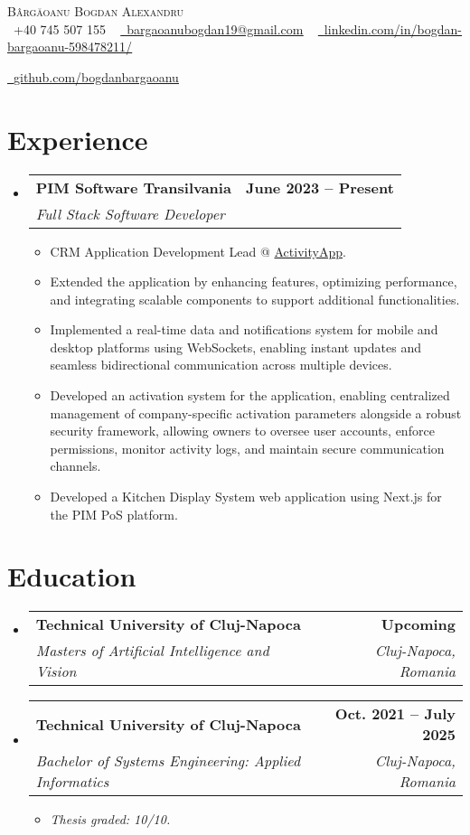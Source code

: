 \documentclass[letterpaper,11pt]{article}
\makeatletter
\newcommand{\resumeItem}[1]{
  \item\small{
    {#1 \vspace{-2pt}}
  }
}
\newcommand{\resumeSubheading}[4]{
  \vspace{-2pt}\item
    \begin{tabular*}{1.0\textwidth}[t]{l@{\extracolsep{\fill}}r}
      \textbf{#1} & \textbf{\small #2} \\
      \textit{\small#3} & \textit{\small #4} \\
    \end{tabular*}\vspace{-7pt}
}
\newcommand{\resumeSubHeadingListStart}{\begin{itemize}[leftmargin=0.0in, label={}]}
\newcommand{\resumeSubHeadingListEnd}{\end{itemize}}
\newcommand{\resumeItemListStart}{\begin{itemize}}
\newcommand{\resumeItemListEnd}{\end{itemize}\vspace{-5pt}}
\makeatother
\begin{document}
\begin{center}
    {\Huge \scshape Bârgăoanu Bogdan Alexandru} \\ \vspace{1pt}
    \small \raisebox{-0.1\height}\faPhone\ +40 745 507 155 ~ 
    \href{mailto:bargaoanubogdan19@gmail.com}{\raisebox{-0.2\height}\faEnvelope\  \underline{bargaoanubogdan19@gmail.com}} ~ 
    \href{https://linkedin.com/in//}{\raisebox{-0.2\height}\faLinkedin\ \underline{linkedin.com/in/bogdan-bargaoanu-598478211/}}  ~
    
    \href{https://github.com/bogdanbargaoanu}{\raisebox{-0.2\height}\faGithub\ \underline{github.com/bogdanbargaoanu}}
    \vspace{-8pt}
\end{center}
\section{Experience}
  \resumeSubHeadingListStart
   \resumeSubheading
      {PIM Software Transilvania}{June 2023 -- Present}
      {Full Stack Software Developer}{}
      \resumeItemListStart
        \resumeItem{CRM Application Development Lead @ \href{https://pimsoftware.ro/activityapp/}{ActivityApp}.}
        \resumeItem{Extended the application by enhancing features, optimizing performance, and integrating scalable components to support additional functionalities.}
        \resumeItem{ Implemented a real-time data and notifications system for mobile and desktop platforms using WebSockets, enabling instant updates and seamless bidirectional communication across multiple devices.}
        \resumeItem{ Developed an activation system for the application, enabling centralized management of company-specific activation parameters alongside a robust security framework, allowing owners to oversee user accounts, enforce permissions, monitor activity logs, and maintain secure communication channels.}
        \resumeItem{ Developed a Kitchen Display System web application using Next.js for the PIM PoS platform.}
      \resumeItemListEnd
  \resumeSubHeadingListEnd
\vspace{-16pt}

\section{Education}
  \resumeSubHeadingListStart
    \resumeSubheading
      {Technical University of Cluj-Napoca}{Upcoming}
      {Masters of Artificial Intelligence and Vision}{Cluj-Napoca, Romania}
    \resumeSubheading
      {Technical University of Cluj-Napoca}{Oct. 2021 -- July 2025}
      {Bachelor of Systems Engineering: Applied Informatics}{Cluj-Napoca, Romania}
      \resumeItemListStart
        \resumeItem{\emph{Thesis graded: 10/10.}}
      \resumeItemListEnd
  \resumeSubHeadingListEnd
  
\end{document}
